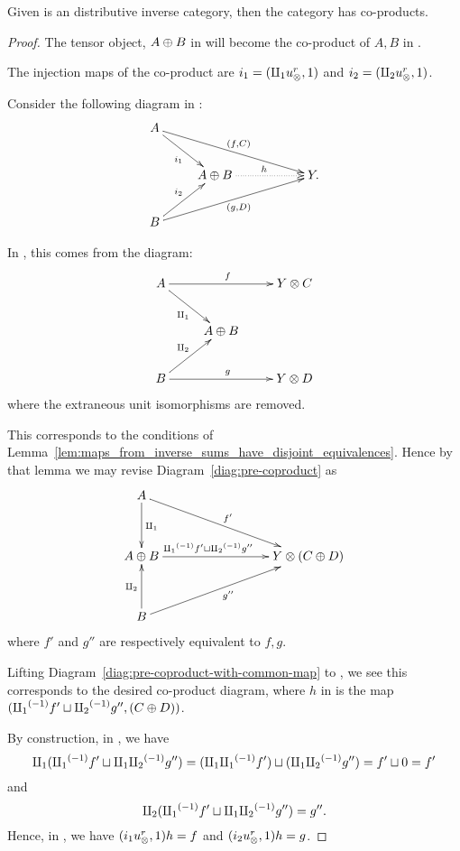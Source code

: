 \begin{proposition}\label{thm:x_tilde_has_coproducts_if_x_is_inverse_distributive_category}
  Given \X is an distributive inverse category, then the category \Xt has co-products.
\end{proposition}
\begin{proof}
  The tensor object, $A\oplus B$ in \X will become the co-product of $A, B$ in \Xt.

  The injection maps of the co-product are $i_1 =(\amalg_{1} u_{\otimes}^r, 1)$ and $i_2 = (\amalg_{2} u_{\otimes}^r, 1)$.

  Consider the following diagram in \Xt:
  \[
    \xymatrix{
      A \ar[drrr]^{(f,C)} \ar[dr]_{i_1} \\
      & A\+B \ar@{.>}[rr]^h & & Y. \\
      B \ar[urrr]_{(g,D)} \ar[ur]^{i_2}
    }
  \]

  In \X, this comes from the diagram:
  \begin{equation}
    \xymatrix{
      A \ar[dr]_{\cpa} \ar[rr]^f && Y\*C\\
      & A\+B\\
      B \ar[ur]^{\cpb} \ar[rr]^g && Y\*D\\
    }\label{diag:pre-coproduct}
  \end{equation}
  where the extraneous unit isomorphisms are removed.

  This corresponds to the conditions of
  Lemma~\ref{lem:maps_from_inverse_sums_have_disjoint_equivalences}. Hence by that lemma we may
  revise Diagram~\ref{diag:pre-coproduct} as
  \begin{equation}
    \xymatrix@R+10pt {
      A \ar[d]^{\cpa} \ar[drrr]^{f'}\\
      A\+B \ar[rrr]^(.4){\icpa f' \djoin \icpb g''} &&& Y\*(C\+D)\\
      B \ar[u]^{\cpb} \ar[urrr]_{g''}\\
    }\label{diag:pre-coproduct-with-common-map}
  \end{equation}
  where $f'$ and $g''$ are respectively equivalent to $f,g$.

  Lifting Diagram~\ref{diag:pre-coproduct-with-common-map} to \X, we see this corresponds to the
  desired co-product diagram, where  $h$ in \Xt is the map $({\amalg_{1}}^{(-1)} f' \sqcup {\amalg_{2}}^{(-1)} g'', (C\oplus D))$.

  By construction, in \X, we have
  \[
    \amalg_{1} ({\amalg_{1}}^{(-1)} f' \sqcup \amalg_{1}{\amalg_{2}}^{(-1)} g'') = (\amalg_{1}{\amalg_{1}}^{(-1)} f') \sqcup (\amalg_{1}{\amalg_{2}}^{(-1)} g'') = f' \sqcup 0 = f'
  \]
  and
  \[
    \amalg_{2} ({\amalg_{1}}^{(-1)} f' \sqcup \amalg_{1}{\amalg_{2}}^{(-1)} g'') = g''.
  \]
  Hence, in \Xt, we have  $(i_1 u_{\otimes}^r, 1) h = f$ and $(i_2 u_{\otimes}^r, 1) h = g$.


\end{proof}
